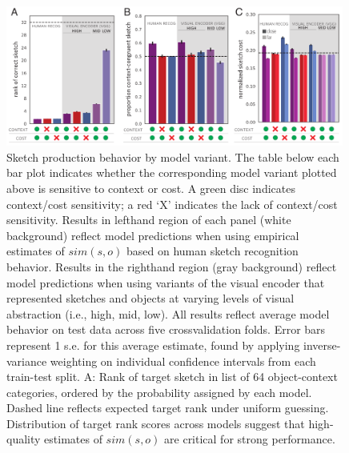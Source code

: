 \documentclass[9pt,twocolumn,twoside]{pnas-new}
\begin{document}

\begin{figure}[htbp]
\centering
\includegraphics[width=0.99\textwidth]{figures/5_model_results_2.pdf}
\caption{Sketch production behavior by model variant. 
The table below each bar plot indicates whether the corresponding model variant plotted above is sensitive to context or cost. 
A green disc indicates context/cost sensitivity; a red `X' indicates the lack of context/cost sensitivity. 
Results in lefthand region of each panel (white background) reflect model predictions when using empirical estimates of $sim(s,o)$ based on human sketch recognition behavior. 
Results in the righthand region (gray background) reflect model predictions when using variants of the visual encoder that represented sketches and objects at varying levels of visual abstraction (i.e., high, mid, low).
All results reflect average model behavior on test data across five crossvalidation folds. 
Error bars represent 1 s.e. for this average estimate, found by applying inverse-variance weighting on individual confidence intervals from each train-test split. 
A: Rank of target sketch in list of 64 object-context categories, ordered by the probability assigned by each model. 
Dashed line reflects expected target rank under uniform guessing. 
Distribution of target rank scores across models suggest that high-quality estimates of $sim(s,o)$ are critical for strong performance. 
}
\end{figure}
\end{document}
